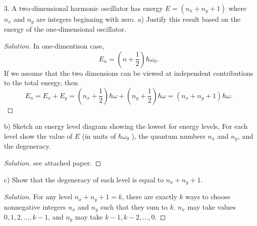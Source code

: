 3. A two-dimensional harmonic oscillator has energy $E=\left(n_x+n_y+1\right)$ where $n_x$ and $n_y$ are integers beginning with zero.
a) Justify this result based on the energy of the one-dimensional oscillator.
\begin{proof}[Solution]
	In one-dimentison case, \[
		E_n=\left(n+\frac{1}{2}\right) \hbar \omega_0
	.\] 
	If we assume that the two dimensions can be viewed at independent contributions to the total energy, then
	\[
		E_n = E_x + E_y = (n_x + \frac{1}{2}) \hbar \omega + (n_y + \frac{1}{2}) \hbar \omega =   (n_x + n_y + 1) \hbar \omega
	.\] 
\end{proof}

b) Sketch an energy level diagram showing the lowest for energy levels, For each level show the value of $E$ (in units of $\hbar \omega_0$ ), the quantum numbers $n_x$ and $n_y$, and the degeneracy.
\begin{proof}[Solution]
	see attached paper.
\end{proof}

c) Show that the degeneracy of each level is equal to $n_x+n_y+1$.
\begin{proof}[Solution]
	For any level $n_x + n_y + 1 = k$, there are exactly $k$ ways to choose nonnegative integers $n_x$ and $n_y$ such that they sum to $k$. $n_x$ may take values $0, 1, 2, \ldots, k-1$, and $n_y$ may take $k-1, k-2, \ldots, 0$.
\end{proof}

